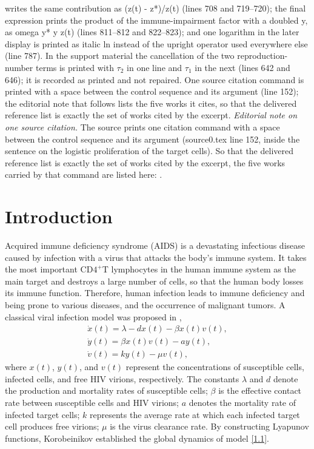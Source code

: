 \documentclass[10pt,a4paper]{amsart}
\numberwithin{equation}{section}
\begin{document}
writes the same contribution as (z(t) - z*)/z(t) (lines 708 and 719--720); the final expression prints the product of the immune-impairment factor with a doubled y, as omega y* y z(t) (lines 811--812 and 822--823); and one logarithm in the later display is printed as italic ln instead of the upright operator used everywhere else (line 787). In the support material the cancellation of the two reproduction-number terms is printed with $\tau_2$ in one line and $\tau_1$ in the next (lines 642 and 646); it is recorded as printed and not repaired. One source citation command is printed with a space between the control sequence and its argument (line 152); the editorial note that follows lists the five works it cites, so that the delivered reference list is exactly the set of works cited by the excerpt.
\noindent\textit{Editorial note on one source citation.} The source prints one citation command with a space between the control sequence and its argument (source0.tex line 152, inside the sentence on the logistic proliferation of the target cells). So that the delivered reference list is exactly the set of works cited by the excerpt, the five works carried by that command are listed here: \cite{LGM,LS,PC,WLL,ZZZ}.\par\smallskip
\section{Introduction}

Acquired immune deficiency syndrome (AIDS)
is a devastating infectious disease caused by infection with a virus that attacks 
the body's immune system. It takes the most important CD$4^{+}$T lymphocytes in 
the human immune system as the main target and destroys a large number  
of cells, so that the human body losses its immune function. 
Therefore, human infection leads to immune deficiency and being prone to
various diseases, and the occurrence of malignant tumors.
A classical viral infection model was proposed in \cite{BM},
\begin{equation}\label{1.1}
\begin{gathered}
\dot{x}(t)=\lambda-dx(t)-\beta x(t)v(t),  \\
\dot{y}(t)=\beta x(t)v(t)-ay(t),\\
\dot{v}(t)=ky(t)-\mu v(t),
\end{gathered}
\end{equation}
where $x(t)$, $y(t)$, and $v(t)$ represent the concentrations of susceptible cells, 
infected cells, and free HIV virions, respectively.
The constants $\lambda$ and $d$  denote the production  and mortality rates of 
susceptible cells; $\beta$ is the effective
contact rate between susceptible cells and HIV virions; 
$a$ denotes the mortality rate of infected target cells; 
$k$ represents the average rate at which each infected target
cell produces free virions; $\mu$ is the virus clearance rate.  
By constructing Lyapunov functions, Korobeinikov \cite{K}  established  the global 
dynamics of  model \eqref{1.1}.
\end{document}
